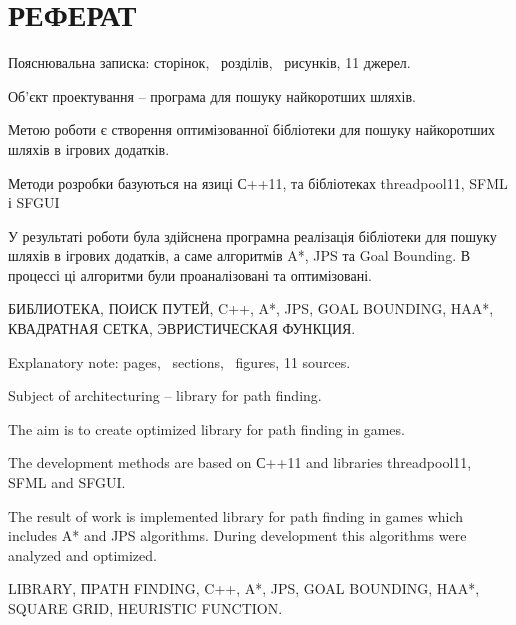 \section*{РЕФЕРАТ}

\vspace{1\baselineskip}

\thispagestyle{empty}

Пояснювальна записка: \pageref{LastPage} сторінок, \totalsections\ розділів,  \totalfigures\ рисунків, 11 джерел.

Об'єкт проектування -- програма для пошуку найкоротших шляхів.

Метою роботи є створення оптимізованної бібліотеки для пошуку найкоротших шляхів в ігрових додатків.

Методи розробки базуються на язиці С++11, та бібліотеках threadpool11, SFML і SFGUI

У результаті роботи була здійснена програмна реалізація бібліотеки для пошуку шляхів в ігрових додатків, а саме алгоритмів A*, JPS та Goal Bounding. В процессі ці алгоритми були проаналізовані та оптимізовані.

БИБЛИОТЕКА, ПОИСК ПУТЕЙ, C++, A*, JPS, GOAL BOUNDING, HAA*, КВАДРАТНАЯ СЕТКА, ЭВРИСТИЧЕСКАЯ ФУНКЦИЯ.

\vspace{1\baselineskip}

Explanatory note: \pageref{LastPage} pages, \totalsections\ sections,  \totalfigures\ figures, 11 sources.

Subject of architecturing -- library for path finding.

The aim is to create optimized library for path finding in games.

The development methods are based on С++11 and libraries threadpool11, SFML and SFGUI.

The result of work is implemented library for path finding in games which includes A* and JPS algorithms. During development this algorithms were analyzed and optimized.

LIBRARY, ПPATH FINDING, C++, A*, JPS, GOAL BOUNDING, HAA*, SQUARE GRID, HEURISTIC FUNCTION.